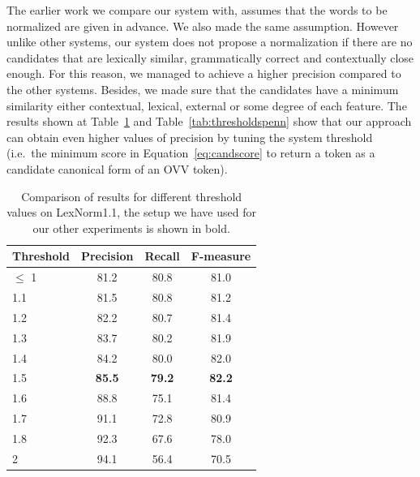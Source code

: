 \documentclass[a4paper,onesided,12pt]{report}
\begin{document}
The earlier work we compare our system with, assumes that the words to be normalized are given in advance. We also made the same assumption. However unlike other systems\cite{DBLP:conf/emnlp/YangE13,liu2012broad,Han:2011:LNS:2002472.2002520}, our system does not propose a normalization if there are no candidates that are lexically similar, grammatically correct and contextually close enough. For this reason, we managed to achieve a higher precision compared to the other systems. Besides, we made sure that the candidates have a minimum similarity either contextual, lexical, external or some degree of each feature. The results shown at Table~\ref{tab:thresholds} and Table~\ref{tab:thresholdspenn} show that our approach can obtain even higher values of precision by tuning the system threshold (i.e.~the minimum score in Equation~\ref{eq:candscore} to return a token as a candidate canonical form of an OVV token).
\\
\begin{table}[thb]
  \caption{Comparison of results for different threshold values on LexNorm1.1, the setup we have used for our other experiments is shown in bold.}
  \centering
  \begin{tabular}[th]{|l|c|c|c|}
    \hline
    \textbf{Threshold} & \textbf{Precision} & \textbf{Recall} & \textbf{F-measure} \\
    \hline
    $\leq$ 1 & 81.2 &	80.8 &	81.0 \\\hline
    1.1 & 81.5 & 80.8 &	81.2 \\\hline
    1.2 & 82.2 &	80.7 &	81.4 \\\hline
    1.3 & 83.7 &	80.2 &	81.9 \\\hline
    1.4 & 84.2 &	80.0 &	82.0 \\\hline
    1.5 & \textbf{85.5} &  \textbf{79.2} &  \textbf{82.2} \\\hline
    1.6 & 88.8	& 75.1	& 81.4 \\\hline
    1.7	& 91.1	& 72.8	& 80.9 \\\hline
    1.8	& 92.3	& 67.6	& 78.0 \\\hline
    2	& 94.1	& 56.4	& 70.5 \\
    \hline
  \end{tabular}
\label{tab:thresholds}
\end{table}
\end{document}
